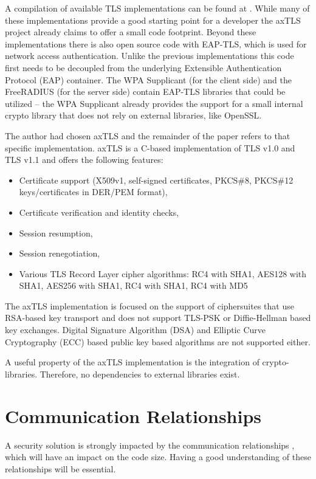 \documentclass[a4paper, 10pt]{IEEEtran}
\begin{document}
A compilation of available TLS implementations can be found at \cite{TLS-Implementations}. While many of these implementations provide a good starting point for a developer the axTLS project \cite{axTLS} already claims to offer a small code footprint. Beyond these implementations there is also open source code with EAP-TLS, which is used for network access authentication. Unlike the previous implementations this code first needs to be decoupled from the underlying Extensible Authentication Protocol (EAP) container. The WPA Supplicant \cite{wpa-supplicant} (for the client side) and the FreeRADIUS \cite{FreeRADIUS} (for the server side) contain EAP-TLS libraries that could be utilized -- the WPA Supplicant already provides the support for a small internal crypto library that does not rely on external libraries, like OpenSSL. 

The author had chosen axTLS and the remainder of the paper refers to that specific implementation. axTLS is a C-based implementation of TLS v1.0 and TLS v1.1 and offers the following features: 
\begin{itemize}
\item Certificate support (X509v1, self-signed certificates, PKCS\#8, PKCS\#12 keys/certificates in DER/PEM format), 
\item Certificate verification and identity checks, 
\item Session resumption,
\item Session renegotiation,
\item Various TLS Record Layer cipher algorithms: RC4 with SHA1, AES128 with SHA1, AES256 with SHA1, RC4 with SHA1, RC4 with MD5
\end{itemize}

The axTLS implementation is focused on the support of ciphersuites that use RSA-based key transport and does not support TLS-PSK \cite{rfc4346} or Diffie-Hellman based key exchanges. Digital Signature Algorithm (DSA) and Elliptic Curve Cryptography (ECC) based public key based algorithms are not supported either. 

A useful property of the axTLS implementation is the integration of crypto-libraries. Therefore, no dependencies to external libraries exist.

\section{Communication Relationships}
\label{relationships} 

A security solution is strongly impacted by the communication relationships \cite{rfc4101}, which will have an impact on the code size. Having a good understanding of these relationships will be essential. 
\end{document}
